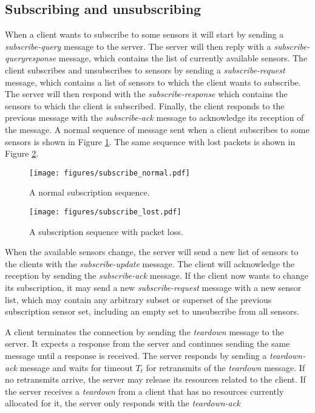 \documentclass[a4paper]{article}
\begin{document}
\subsection{Subscribing and unsubscribing}
When a client wants to subscribe to some sensors it will start by sending a 
\emph{subscribe-query} message to the server. The server will then reply with
a \emph{subscribe-queryresponse} message, which contains the list of currently
available sensors. The client subscribes and unsubscribes to sensors by sending a 
\emph{subscribe-request} message, which contains a list of sensors to which 
the client wants to subscribe. The server will then respond with the
\emph{subscribe-response} which contains the sensors to which the client is
subscribed. Finally, the client responds to the previous message with the 
\emph{subscribe-ack} message to acknowledge its reception of the message.
A normal sequence of message sent when a client subscribes to some sensors
is shown in Figure \ref{fig:sub_normal}. The same sequence with lost packets 
is shown in Figure \ref{fig:sub_lost}.

\begin{figure}[htb]
	\centering
    \texttt{[image: figures/subscribe\_normal.pdf]}
    \caption{A normal subscription sequence.}
    \label{fig:sub_normal}
\end{figure}

\begin{figure}[htb]
	\centering
    \texttt{[image: figures/subscribe\_lost.pdf]}
    \caption{A subscription sequence with packet loss.}
    \label{fig:sub_lost}
\end{figure}

\newpage

When the available sensors change, the server will send a new list of sensors
to the clients with the \emph{subscribe-update} message. The client will
acknowledge the reception by sending the \emph{subscribe-ack} message. If the
client now wants to change its subscription, it may send a new 
\emph{subscribe-request} message with a new sensor list, which may contain any arbitrary subset or superset of the previous subscription sensor set, including an empty set to unsubscribe from all sensors.

A client terminates the connection by sending the \emph{teardown} message to the
server. It expects a response from the server and continues sending the same
message until a response is received. The server responds by sending a
\emph{teardown-ack} message and waits for timeout $T_t$ for retransmits of the \emph{teardown} message. If no retransmits arrive, the server may release its resources
related to the client. If the server receives a \emph{teardown} from a client that has no resources currently allocated for it, the server only responds with the \emph{teardown-ack}
\end{document}
